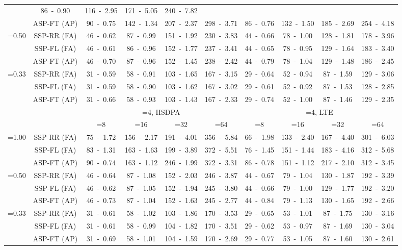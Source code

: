 \documentclass[10pt,twocolumn,journal]{IEEEtran}
\begin{document}
\begin{table*}[t!]
{\begin{tabular}{|c|c|c|c|c|c|c|c|c|c|}
& 86~-~0.90 & 116~-~2.95 & 171~-~5.05 & 240~-~7.82 \\
& ASP-FT (AP) & 90~-~0.75 & 142~-~1.34 & 207~-~2.37 & 298~-~3.71 
& 86~-~0.76 & 132~-~1.50 & 185~-~2.69 & 254~-~4.18 \\
\hline
\multirow{3}{*}{=0.50} & SSP-RR (FA) & 46~-~0.62 & 87~-~0.99 & 151~-~1.92 & 230~-~3.83 
& 44~-~0.66 & 78~-~1.00 & 128~-~1.81 & 178~-~3.96 \\
& SSP-FL (FA) & 46~-~0.61 & 86~-~0.96 & 152~-~1.77 & 237~-~3.41 
& 44~-~0.65 & 78~-~0.95 & 129~-~1.64 & 183~-~3.40 \\
& ASP-FT (AP) & 46~-~0.70 & 87~-~0.96 & 152~-~1.45 & 238~-~2.42 
& 44~-~0.79 & 78~-~1.04 & 129~-~1.48 & 186~-~2.45 \\
\hline
\multirow{3}{*}{=0.33} & SSP-RR (FA) & 31~-~0.59 & 58~-~0.91 & 103~-~1.65 & 167~-~3.15 
& 29~-~0.64 & 52~-~0.94 & 87~-~1.59 & 129~-~3.06 \\
& SSP-FL (FA) & 31~-~0.59 & 58~-~0.90 & 103~-~1.62 & 167~-~3.02 
& 29~-~0.61 & 52~-~0.92 & 87~-~1.53 & 128~-~2.85 \\
& ASP-FT (AP) & 31~-~0.66 & 58~-~0.93 & 103~-~1.43 & 167~-~2.33 
& 29~-~0.74 & 52~-~1.00 & 87~-~1.46 & 129~-~2.35 \\
\hline
\hline
& 	 & \multicolumn{4}{c|}{=4, HSDPA} & \multicolumn{4}{c|}{=4, LTE} \\
\hline
& 	 & =8 & =16 & =32 & =64  & =8 & =16 & =32 & =64 \\
\hline
\multirow{3}{*}{=1.00} & SSP-RR (FA) & 75~-~1.72 & 156~-~2.17 & 191~-~4.01 & 356~-~5.84 
& 66~-~1.98 & 133~-~2.40 & 167~-~4.40 & 301~-~6.03 \\
& SSP-FL (FA) & 83~-~1.31 & 163~-~1.63 & 199~-~3.89 & 372~-~5.51 
& 76~-~1.45 & 151~-~1.44 & 183~-~4.16 & 312~-~5.68 \\
& ASP-FT (AP) & 90~-~0.74 & 163~-~1.12 & 246~-~1.99 & 372~-~3.31 
& 86~-~0.78 & 151~-~1.12 & 217~-~2.10 & 312~-~3.45 \\
\hline
\multirow{3}{*}{=0.50} & SSP-RR (FA) & 46~-~0.64 & 87~-~1.08 & 152~-~2.03 & 246~-~3.87 
& 44~-~0.67 & 79~-~1.04 & 130~-~1.87 & 192~-~3.39 \\
& SSP-FL (FA) & 46~-~0.62 & 87~-~1.05 & 152~-~1.94 & 245~-~3.80 
& 44~-~0.66 & 79~-~1.00 & 129~-~1.77 & 192~-~3.20 \\
& ASP-FT (AP) & 46~-~0.73 & 87~-~1.04 & 152~-~1.63 & 245~-~2.77 
& 44~-~0.84 & 79~-~1.13 & 130~-~1.65 & 192~-~2.66 \\
\hline
\multirow{3}{*}{=0.33} & SSP-RR (FA) & 31~-~0.61 & 58~-~1.02 & 103~-~1.86 & 170~-~3.53 
& 29~-~0.65 & 53~-~1.01 & 87~-~1.75 & 130~-~3.16 \\
& SSP-FL (FA) & 31~-~0.61 & 58~-~0.99 & 104~-~1.82 & 170~-~3.51 
& 29~-~0.62 & 53~-~0.97 & 87~-~1.69 & 130~-~3.04 \\
& ASP-FT (AP) & 31~-~0.69 & 58~-~1.01 & 104~-~1.59 & 170~-~2.69 
& 29~-~0.77 & 53~-~1.05 & 87~-~1.60 & 130~-~2.61 \\
\hline
\end{tabular}
}
\end{table*}
\end{document}
